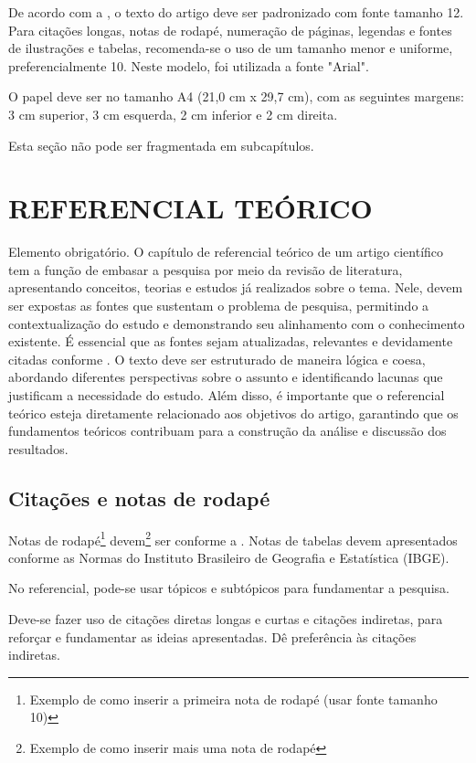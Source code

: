 \documentclass[
	article,
	12pt,
	oneside,
	a4paper,
	english,
	brazil,
	sumario=tradicional
]{abntex2}
\begin{document}
De acordo com a , o texto do artigo deve ser padronizado com fonte tamanho 12. Para citações longas, notas de rodapé, numeração de páginas, legendas e fontes de ilustrações e tabelas, recomenda-se o uso de um tamanho menor e uniforme, preferencialmente 10. Neste modelo, foi utilizada a fonte "Arial".

O papel deve ser no tamanho A4 (21,0 cm x 29,7 cm), com as seguintes margens: 3 cm superior, 3 cm esquerda, 2 cm inferior e 2 cm direita.

Esta seção não pode ser fragmentada em subcapítulos.

\section{\textbf{REFERENCIAL TEÓRICO}}

Elemento obrigatório. O capítulo de referencial teórico de um artigo científico tem a função de embasar a pesquisa por meio da revisão de literatura, apresentando conceitos, teorias e estudos já realizados sobre o tema. Nele, devem ser expostas as fontes que sustentam o problema de pesquisa, permitindo a contextualização do estudo e demonstrando seu alinhamento com o conhecimento existente. É essencial que as fontes sejam atualizadas, relevantes e devidamente citadas conforme  . O texto deve ser estruturado de maneira lógica e coesa, abordando diferentes perspectivas sobre o assunto e identificando lacunas que justificam a necessidade do estudo. Além disso, é importante que o referencial teórico esteja diretamente relacionado aos objetivos do artigo, garantindo que os fundamentos teóricos contribuam para a construção da análise e discussão dos resultados.

\subsection{Citações e notas de rodapé}

Notas de rodapé\footnote{Exemplo de como inserir a primeira nota de rodapé (usar fonte tamanho 10)} devem\footnote{Exemplo de como inserir mais uma nota de rodapé} ser conforme a . Notas de tabelas devem apresentados conforme as Normas do Instituto Brasileiro de Geografia e Estatística (IBGE).

No referencial, pode-se usar tópicos e subtópicos para fundamentar a pesquisa.

Deve-se fazer uso de citações diretas longas e curtas e citações indiretas, para reforçar e fundamentar as ideias apresentadas. Dê preferência às citações indiretas. 
\end{document}
